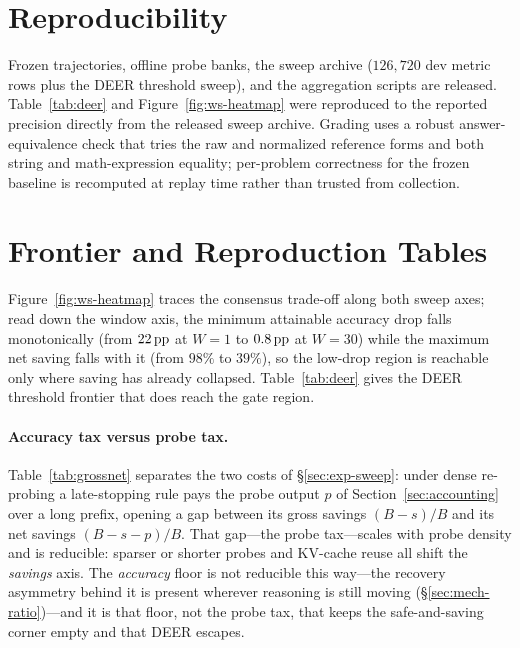\section{Reproducibility}
\label{sec:appendix-repro}

Frozen trajectories, offline probe banks, the sweep archive
($126{,}720$ dev metric rows plus the DEER threshold sweep), and the aggregation
scripts are released.
Table~\ref{tab:deer} and Figure~\ref{fig:ws-heatmap} were reproduced to the
reported precision directly from the released sweep archive. Grading uses a robust
answer-equivalence check that
tries the raw and normalized reference forms and both string and
math-expression equality; per-problem correctness for the frozen baseline is
recomputed at replay time rather than trusted from collection.

\section{Frontier and Reproduction Tables}
\label{sec:appendix-tables}

Figure~\ref{fig:ws-heatmap} traces the consensus trade-off along both sweep
axes; read down the window axis, the minimum attainable accuracy drop falls
monotonically (from $22\,\text{pp}$ at $W{=}1$ to $0.8\,\text{pp}$ at $W{=}30$) while the maximum
net saving falls with it (from $98\%$ to $39\%$), so the low-drop region is
reachable only where saving has already collapsed. Table~\ref{tab:deer} gives
the DEER threshold frontier that does reach the gate region.

\paragraph{Accuracy tax versus probe tax.}
Table~\ref{tab:grossnet} separates the two costs of \S\ref{sec:exp-sweep}:
under dense re-probing a late-stopping rule pays the probe output $p$ of
Section~\ref{sec:accounting} over a long prefix, opening a gap between its gross
savings $(B-s)/B$ and its net savings $(B-s-p)/B$. That gap---the probe
tax---scales with probe density and is reducible: sparser or shorter probes and
KV-cache reuse all shift the \emph{savings} axis. The \emph{accuracy} floor is
not reducible this way---the recovery asymmetry behind it is present wherever
reasoning is still moving (\S\ref{sec:mech-ratio})---and it is that floor, not
the probe tax, that keeps the safe-and-saving corner empty and that DEER
escapes.

